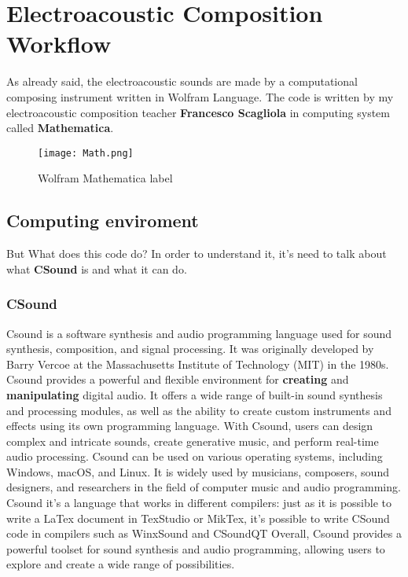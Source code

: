 
\chapter{Electroacoustic Composition Workflow}
\label{chp:fundamentals}

As already said, the electroacoustic sounds are made by a computational composing instrument written in Wolfram Language. The code is written by my electroacoustic composition teacher \textbf{Francesco Scagliola} in computing system called \textbf{Mathematica}. 
	
\begin{figure}[h]
	\begin{center}
		\texttt{[image: Math.png]}
		\caption{Wolfram Mathematica label}
	\end{center}
\end{figure}
	
	\section{Computing enviroment}
	But What does this code do?
	In order to understand it, it's need to talk about what \textbf{CSound} is and what it can do.
	
		\subsection{CSound}
		Csound is a software synthesis and audio programming language used for sound synthesis, composition, and signal processing. It was originally developed by Barry Vercoe at the Massachusetts Institute of Technology (MIT) in the 1980s.
		Csound provides a powerful and flexible environment for \textbf{creating} and \textbf{manipulating} digital audio. It offers a wide range of built-in sound synthesis and processing modules, as well as the ability to create custom instruments and effects using its own programming language. With Csound, users can design complex and intricate sounds, create generative music, and perform real-time audio processing.
		Csound can be used on various operating systems, including Windows, macOS, and Linux. It is widely used by musicians, composers, sound designers, and researchers in the field of computer music and audio programming.
		Csound it's a language that works in different compilers: just as it is possible to write a LaTex document in TexStudio or MikTex, it's possible to write CSound code in compilers such as WinxSound and CSoundQT
		Overall, Csound provides a powerful toolset for sound synthesis and audio programming, allowing users to explore and create a wide range of possibilities.
		
